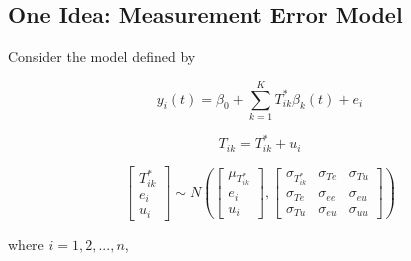 \subsection{One Idea: Measurement Error Model}



Consider the model defined by

\begin{equation}
y_{i}(t) = \beta_{0}+\sum_{k=1}^{K}T_{ik}^{*}\beta_{k}(t) + e_{i}
\end{equation}

\begin{equation}
T_{ik} = T_{ik}^{*} + u_{i}
\end{equation}

\begin{equation}
\left[
  \begin{array}{c}
     T_{ik}^{*}\\
     e_{i} \\
     u_{i}
  \end{array}
\right]
\sim
N(\left[
  \begin{array}{c}
  \mu_{T_{ik}^{*}}\\
     e_{i} \\
     u_{i}
  \end{array}
\right],
\left[
  \begin{array}{ccc}
  \sigma_{T_{ik}^{*}} & 
  \sigma_{Te} & \sigma_{Tu}\\
  \sigma_{Te} & \sigma_{ee} &\sigma_{eu}\\
  \sigma_{Tu} & \sigma_{eu} &
  \sigma_{uu}
  \end{array}
\right]
)
\end{equation}

where $i = 1,2,...,n$, 
	
